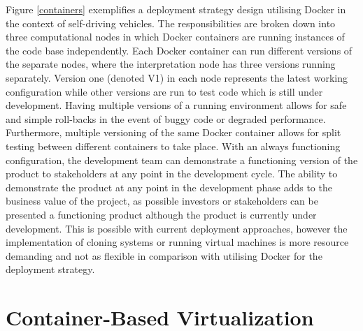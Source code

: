 Figure \ref{containers} exemplifies a deployment strategy design utilising Docker in the context of self-driving vehicles. The responsibilities are broken down into three computational nodes in which Docker containers are running instances of the code base independently. Each Docker container can run different versions of the separate nodes, where the interpretation node has three versions running separately. Version one (denoted V1) in each node represents the latest working configuration while other versions are run to test code which is still under development. Having multiple versions of a running environment allows for safe and simple roll-backs in the event of buggy code or degraded performance. Furthermore, multiple versioning of the same Docker container allows for split testing between different containers to take place. With an always functioning configuration, the development team can demonstrate a functioning version of the product to stakeholders at any point in the development cycle. The ability to demonstrate the product at any point in the development phase adds to the business value of the project, as possible investors or stakeholders can be presented a functioning product although the product is currently under development. This is possible with current deployment approaches, however the implementation of cloning systems or running virtual machines is more resource demanding \cite{p6} and not as flexible in comparison with utilising Docker for the deployment strategy.


\section{Container-Based Virtualization}

